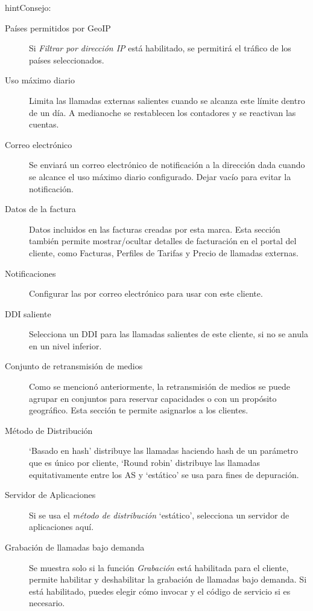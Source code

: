 \documentclass[letterpaper,10pt,spanish]{sphinxmanual}
\begin{document}
\begin{notice}{hint}{Consejo:}
\begin{description}
\item[{Países permitidos por GeoIP}] \leavevmode
Si \emph{Filtrar por dirección IP} está habilitado, se permitirá el tráfico de los países seleccionados.

\item[{Uso máximo diario}] \leavevmode
Limita las llamadas externas salientes cuando se alcanza este límite dentro de un día. A medianoche se restablecen los contadores y se reactivan las cuentas.

\item[{Correo electrónico}] \leavevmode
Se enviará un correo electrónico de notificación a la dirección dada cuando se alcance el uso máximo diario configurado. Dejar vacío para evitar la notificación.

\item[{Datos de la factura}] \leavevmode
Datos incluidos en las facturas creadas por esta marca. Esta sección también permite mostrar/ocultar detalles de facturación en el portal del cliente, como Facturas, Perfiles de Tarifas y Precio de llamadas externas.

\item[{Notificaciones}] \leavevmode
Configurar las {\hyperref[administration_portal/brand/settings/notification_templates:id1]{}} por correo electrónico para usar con este cliente.

\item[{DDI saliente}] \leavevmode
Selecciona un DDI para las llamadas salientes de este cliente, si no se anula en un nivel inferior.

\item[{Conjunto de retransmisión de medios}] \leavevmode
Como se mencionó anteriormente, la retransmisión de medios se puede agrupar en conjuntos para reservar capacidades o con un propósito geográfico. Esta sección te permite asignarlos a los clientes.

\item[{Método de Distribución}] \leavevmode
`Basado en hash' distribuye las llamadas haciendo hash de un parámetro que es único por cliente, `Round robin' distribuye las llamadas equitativamente entre los AS y `estático' se usa para fines de depuración.

\item[{Servidor de Aplicaciones}] \leavevmode
Si se usa el \emph{método de distribución} `estático', selecciona un servidor de aplicaciones aquí.

\item[{Grabación de llamadas bajo demanda}] \leavevmode
Se muestra solo si la función \emph{Grabación} está habilitada para el cliente, permite habilitar y deshabilitar la grabación de llamadas bajo demanda. Si está habilitado, puedes elegir cómo invocar y el código de servicio si es necesario.


\end{description}
\end{notice}
\end{document}

